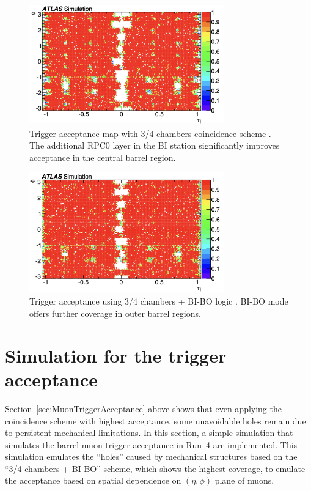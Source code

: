 \begin{figure}[htbp]
  \centering
  \includegraphics[width=0.75\textwidth]{figs/chapter4/trigger_acceptance_map_3_4.png}
  \caption{Trigger acceptance map with 3/4 chambers coincidence scheme \cite{TDAQ_TDR}. The additional RPC0 layer in the BI station significantly improves acceptance in the central barrel region.}
  \label{fig:trigger_acceptance_3_4}
\end{figure}

\begin{figure}[htbp]
  \centering
  \includegraphics[width=0.75\textwidth]{figs/chapter4/trigger_acceptance_map_3_4_BI_BO.png}
  \caption{Trigger acceptance using 3/4 chambers + BI-BO logic \cite{TDAQ_TDR}. BI-BO mode offers further coverage in outer barrel regions.}
  \label{fig:trigger_acceptance_3_4_BI_BO}
\end{figure}
\section{Simulation for the trigger acceptance} 
Section~\ref{sec:MuonTriggerAcceptance} above shows that even applying the coincidence scheme with highest acceptance, some unavoidable holes remain due to persistent mechanical limitations. In this section, a simple simulation that simulates the barrel muon trigger acceptance in Run~4 are implemented. This simulation emulates the ``holes'' caused by mechanical structures based on the ``3/4 chambers + BI-BO'' scheme, which shows the highest coverage, to emulate the acceptance based on spatial dependence on $(\eta, \phi)$ plane of muons.

